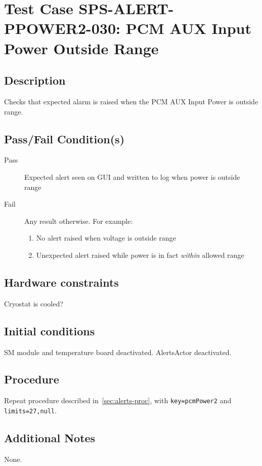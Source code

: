 \section{Test Case SPS-ALERT-PPOWER2-030: PCM AUX Input Power Outside Range}

\subsection{Description}

Checks that expected alarm is raised when the PCM AUX Input Power is outside range.

\subsection{Pass/Fail Condition(s)}

\begin{description}
\item [Pass] Expected alert seen on GUI and written to log when power is outside range
\item [Fail] Any result otherwise. For example:

\begin{enumerate}
    \item No alert raised when voltage is outside range
    \item Unexpected alert raised while power is in fact {\it within} allowed range
\end{enumerate}
\end{description}

\subsection{Hardware constraints}

Cryostat is cooled?

\subsection{Initial conditions}

SM module and temperature board deactivated. AlertsActor deactivated.

\subsection{Procedure}

Repeat procedure described in~\ref{sec:alerts-proc}, with \texttt{key=pcmPower2} and \texttt{limits=27,null}.

\subsection{Additional Notes}
None.
